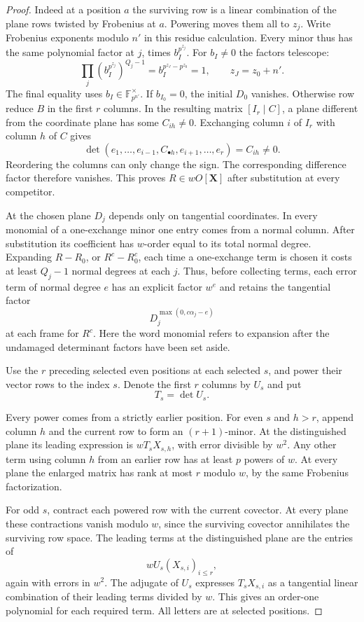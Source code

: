 \begin{proof}
Indeed at a position \(a\) the surviving row is a linear
combination of the plane rows twisted by Frobenius at \(a\).
Powering moves them all to \(z_j\). Write Frobenius exponents
modulo \(n'\) in this residue calculation. Every minor thus has
the same polynomial factor at \(j\), times \(b_I^{p^{z_j}}\).
For \(b_I\ne0\) the factors telescope:
\[
 \prod_j (b_I^{p^{z_j}})^{Q_j-1}
    =b_I^{p^{z_J}-p^{z_0}}=1,\qquad z_J=z_0+n' .
\]
The final equality uses \(b_I\in\mathbb F_{p^{n'}}^\times\). If \(b_{I_0}=0\),
the initial \(D_0\) vanishes. Otherwise row reduce \(B\) in
the first \(r\) columns. In the resulting matrix \([I_r\mid C]\), a plane different
from the coordinate plane has some \(C_{ih}\ne0\). Exchanging column
\(i\) of \(I_r\) with column \(h\) of \(C\) gives
\[
 \det(e_1,\ldots,e_{i-1},C_{\bullet h},e_{i+1},\ldots,e_r)=C_{ih}\ne0 .
\]
Reordering the columns can only change the sign. The corresponding
difference factor therefore vanishes. This proves \(R\in wO[\mathbf X]\) after
substitution at every competitor.

At the chosen plane \(D_j\) depends only on tangential
coordinates. In every monomial of a one-exchange minor one
entry comes from a normal column. After substitution its
coefficient has \(w\)-order equal to its total normal degree.
Expanding \(R-R_0\), or \(R^c-R_0^c\), each time a one-exchange
term is chosen it costs at least \(Q_j-1\) normal degrees at
each \(j\). Thus, before collecting terms, each error term of normal degree
\(e\) has an explicit factor \(w^e\) and retains the tangential
factor
\[
 D_j^{\max(0,c\alpha_j-e)}
\]
at each frame for \(R^c\).
Here the word monomial refers to expansion after the undamaged
determinant factors have been set aside.

Use the \(r\) preceding selected even positions at each selected
\(s\), and power their vector rows to the index \(s\). Denote the
first \(r\) columns by \(U_s\) and put
\[
 T_s=\det U_s.
\]

Every power comes from a strictly earlier position. For even
\(s\) and \(h>r\), append column \(h\) and the current row to
form an \((r+1)\)-minor. At the distinguished plane its leading
expression is \(wT_s X_{s,h}\), with error divisible by \(w^2\).
Any other term using column \(h\) from an earlier row has at
least \(p\) powers of \(w\). At every plane the enlarged
matrix has rank at most \(r\) modulo \(w\), by the same
Frobenius factorization.

For odd \(s\), contract each powered
row with the current covector. At every plane these contractions
vanish modulo \(w\), since the surviving covector annihilates the
surviving row space. The leading terms at the distinguished plane
are the entries of
\[
 wU_s(X_{s,i})_{i\le r},
\]
again with errors
in \(w^2\). The adjugate of \(U_s\) expresses \(T_s X_{s,i}\)
as a tangential linear combination of their leading terms
divided by \(w\). This gives an order-one polynomial for each
required term. All letters are at selected positions.

\end{proof}

